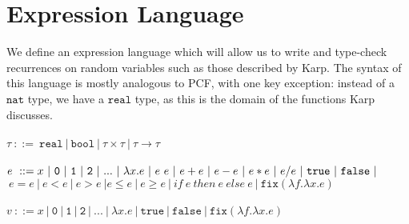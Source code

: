 \documentclass{westhesis}
\begin{document}
\section{Expression Language}
We define an expression language which will allow us to write and type-check recurrences on random variables such as those described by Karp. The syntax of this language is mostly analogous to PCF, with one key exception: instead of a $\texttt{nat}$ type, we have a $\texttt{real}$ type, as this is the domain of the functions Karp discusses. \\ \\
$\tau \ ::= \ \texttt{real} \ | \ \texttt{bool} \ | \ \tau \times \tau \ | \ \tau \rightarrow \tau$ \\ \\
 $e \ ::= x  \ | \ \texttt{0} \ | \ \texttt{1} \ | \ \texttt{2} \ | \ ... \ | \ \lambda x.e \ | \ e \ e \ | \ e + e \ | \ e - e \ | \  e  *  e \ | \ e / e \ | \ \texttt{true} \ | \ \texttt{false} \ | \\$\-\hspace{.8cm}$\ e  =  e \ | \ e < e \ | \ e > e \ | e \leq e \ | \ e \geq e \ | 
 \ if \ e \ then \ e \ else \ e \ | \ \texttt{fix} (\lambda f.\lambda x.e)$ \\ \\
 $v \ ::= x  \ | \ \texttt{0} \ | \ \texttt{1} \ | \ \texttt{2} \ | \ ... \ | \ \lambda x.e \ | \ \texttt{true} \ |  \ \texttt{false} \ 
 | \ \texttt{fix} (\lambda f.\lambda x.e)$
\end{document}
